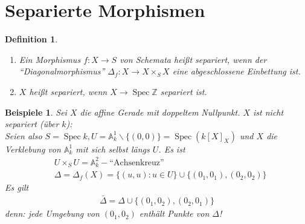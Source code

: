 \documentclass[a4paper,oneside]{scrbook}
\theoremstyle{break}
\newtheorem{Def}{Definition}[section]
\theoremstyle{nonumberbreak}
\newtheorem{nnBsp}{Beispiele}
\theoremstyle{nonumberplain}
\theoremstyle{break}
\newcommand{\Spec}{%
	\ensuremath{\operatorname{Spec}}%
}
\DeclareMathOperator{\id}{id}
\begin{document}
\section{Separierte Morphismen}
\begin{Def}
  \label{def:7.1}
  \begin{enumerate}
  \item Ein Morphismus $f:X\to S$ von Schemata heißt \emph{separiert},  wenn der ``Diagonalmorphismus'' $\Delta_f:X\to X\times_S X$ 
    eine abgeschlossene Einbettung ist.
    \begin{center}
    \end{center}
  \item $X$ heißt \emph{separiert}, wenn $X\to \Spec \mathbb Z$ separiert ist.
  \end{enumerate}
\end{Def}

\begin{nnBsp}
  Sei $X$ die affine Gerade mit doppeltem Nullpunkt. $X$ ist nicht separiert (über $k$): \\
  Seien also $S=\Spec k, U=\mathbb A_k^1\backslash\{(0,0)\}=\Spec(k[X]_X)$ und $X$ die Verklebung von $\mathbb A_k^1$ mit sich selbst längs $U$. 
  Es ist
  \begin{align*}
    & U\times_S U=\mathbb A_k^2-\text{``Achsenkreuz''} \\
    & \Delta=\Delta_f(X)=\{(u,u):u\in U\}\cup\{(0_1,0_1),(0_2,0_2)\}
  \end{align*}
  Es gilt
  \begin{align*}
    \bar{\Delta}=\Delta\cup\{(0_1,0_2),(0_2,0_1)\}
  \end{align*}
  denn: jede Umgebung von $(0_1,0_2)$ enthält Punkte von $\Delta$!
\end{nnBsp}
\end{document}
